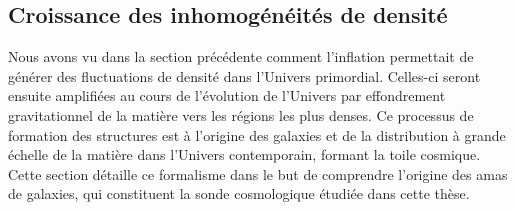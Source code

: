 \subsection{Croissance des inhomogénéités de densité}

Nous avons vu dans la section précédente comment l'inflation permettait de générer des fluctuations de densité dans l'Univers primordial.
Celles-ci seront ensuite amplifiées au cours de l'évolution de l'Univers par effondrement gravitationnel de la matière vers les régions les plus denses.
Ce processus de formation des structures est à l'origine des galaxies et de la distribution à grande échelle de la matière dans l'Univers contemporain, formant la toile cosmique.
Cette section détaille ce formalisme dans le but de comprendre l'origine des amas de galaxies, qui constituent la sonde cosmologique étudiée dans cette thèse.

